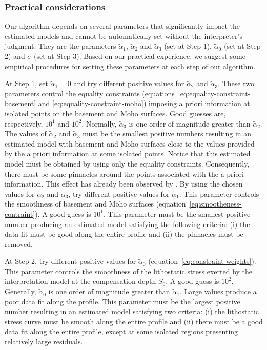 \documentclass[manuscript]{geophysics}
\begin{document}
\subsubsection*{Practical considerations}

Our algorithm depends on several parameters that significantly impact the estimated models
and cannot be automatically set without the interpreter’s judgment.
They are the parameters $\tilde{\alpha}_{1}$, $\tilde{\alpha}_{2}$ and $\tilde{\alpha}_{3}$
(set at Step 1), $\tilde{\alpha}_{0}$ (set at Step 2) and 
$\sigma$ (set at Step 3).
Based on our practical experience, we suggest
some empirical procedures for setting these parameters at each step of our algorithm.

At Step 1, set $\tilde{\alpha}_{1} = 0$ and try different positive values for 
$\tilde{\alpha}_{2}$ and $\tilde{\alpha}_{3}$. 
These two parameters control the equality constraints
(equations~\ref{eq:equality-constraint-basement} and \ref{eq:equality-constraint-moho})
imposing a priori information at isolated points on the basement and Moho surfaces.
Good guesses are, respectively,
$10^{1}$ and $10^{2}$. Normally, $\tilde{\alpha}_{3}$ is one order of magnitude greater
than $\tilde{\alpha}_{2}$.
The values of $\tilde{\alpha}_{2}$ and $\tilde{\alpha}_{3}$ 
must be the smallest positive numbers resulting in an estimated model with
basement and Moho surfaces close to the values provided by the a priori information
at some isolated points. Notice that this estimated model must be obtained 
by using only the equality constraints. Consequently, there must be some
pinnacles around the points associated with the a priori information. This effect
has already been observed by \citet{barbosa-etal1997}.
By using the chosen values for $\tilde{\alpha}_{2}$ and $\tilde{\alpha}_{3}$, 
try different positive values for $\tilde{\alpha}_{1}$. 
This parameter controls the smoothness of basement and Moho surfaces
(equation~\ref{eq:smootheness-contraint}).
A good guess is $10^{1}$.
This parameter must be the smallest positive number producing an estimated model
satisfying the following criteria: (i) the data fit must be good along the entire profile
and (ii) the pinnacles must be removed. 

At Step 2, try different positive values for $\tilde{\alpha}_{0}$ 
(equation~\ref{eq:constraint-weights}). This parameter
controls the smoothness of the lithostatic stress exerted by the interpretation model
at the compensation depth $S_{0}$. A good guess is $10^{2}$.
Generally, $\tilde{\alpha}_{0}$ is one order of magnitude greater than
$\tilde{\alpha}_{1}$. Large values produce a poor data fit along the profile.
This parameter must be the largest positive number resulting in an estimated
model satisfying two criteria: (i) the lithostatic stress curve must be smooth
along the entire profile and (ii) there must be a good data fit along the entire
profile, except at some isolated regions presenting relatively large residuals.
\end{document}
